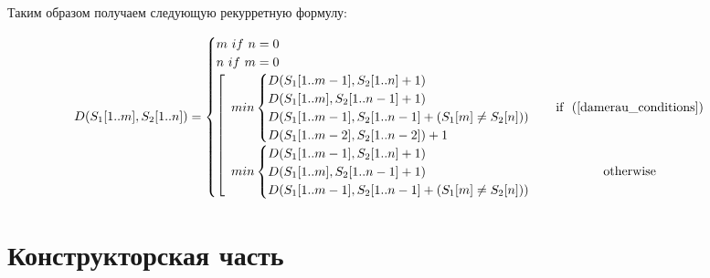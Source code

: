 \documentclass[14pt, a4paper]{report}
\begin{document}
	Таким образом получаем следующую рекурретную формулу:
	
	\begin{equation}
	\label{formula_damerau}
	D(S_{1}[1..m],S_{2}[1..n]) = \begin{cases}
	m\ if\ n = 0\\
	n\ if\ m = 0\\
	\left[\begin{array}{ccc}
		min \begin{cases}
			D(S_{1}[1..m-1], S_{2}[1..n] + 1)\\
			D(S_{1}[1..m], S_{2}[1..n-1]+1)\\
			D(S_{1}[1..m-1], S_{2}[1..n-1]+(S_{1}[m] \neq S_{2}[n]))\\
			D(S_{1}[1..m-2], S_{2}[1..n-2])+1
		\end{cases} & \mbox{if ~(\ref{damerau_conditions})}\\	
		min \begin{cases}
			D(S_{1}[1..m-1], S_{2}[1..n] + 1)\\
			D(S_{1}[1..m], S_{2}[1..n-1]+1)\\
			D(S_{1}[1..m-1], S_{2}[1..n-1]+(S_{1}[m] \neq S_{2}[n]))
		\end{cases} & \mbox{otherwise}\\
	\end{array} \right.
	\end{cases}
	\end{equation}

	\chapter{Конструкторская часть}
	
\end{document}
